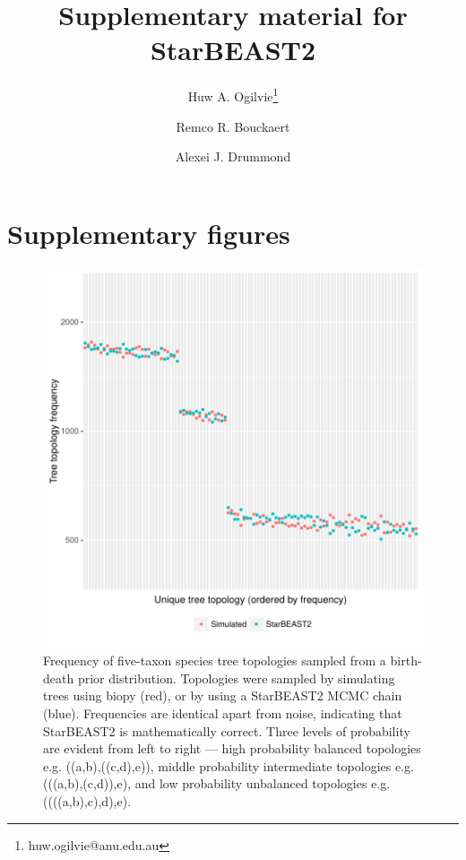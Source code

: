 \documentclass[12pt]{article}
\begin{document}
\title{Supplementary material for StarBEAST2}
\author[1,2]{Huw A. Ogilvie\thanks{huw.ogilvie@anu.edu.au}}
\author[2,3]{Remco R. Bouckaert}
\author[2,3]{Alexei J. Drummond}

\maketitle

\clearpage

\section{Supplementary figures}

\justifying

\begin{figure}[htb!]
\centering
\includegraphics[width=130mm]{species_topology_frequencies.pdf}
\caption
{Frequency of five-taxon species tree topologies sampled from a birth-death prior
distribution. Topologies were sampled by simulating trees using biopy (red), or
by using a StarBEAST2 MCMC chain (blue). Frequencies are identical apart from
noise, indicating that StarBEAST2 is mathematically correct. Three levels of
probability are evident from left to right --- high probability balanced
topologies e.g. ((a,b),((c,d),e)), middle probability intermediate topologies
e.g. (((a,b),(c,d)),e), and low probability unbalanced topologies e.g.
((((a,b),c),d),e).}
\label{fig:speciesTopologyFrequencies}
\end{figure}
\end{document}

